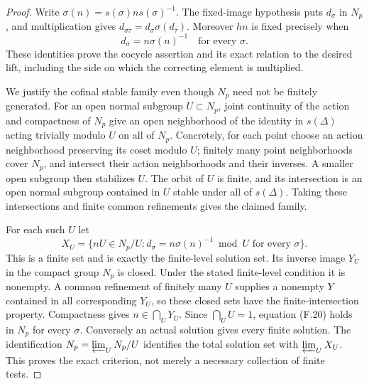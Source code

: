 \begin{proof}
Write $\sigma(n)=s(\sigma)n s(\sigma)^{-1}$.
The fixed-image hypothesis puts $d_\sigma$ in $N_p$,
and multiplication gives
$d_{\sigma\tau}=d_\sigma\sigma(d_\tau)$.
Moreover $hn$ is fixed precisely when
\[
             d_\sigma=n\sigma(n)^{-1}
                         \quad\text{for every }\sigma.       \tag{F.20}
\]
These identities prove the cocycle assertion and its
exact relation to the desired lift, including the
side on which the correcting element is multiplied.

We justify the cofinal stable family even though
$N_p$ need not be finitely generated.
For an open normal subgroup $U\subset N_p$, joint
continuity of the action and compactness of $N_p$
give an open neighborhood of the identity in
$s(\Delta)$ acting trivially modulo $U$ on all of
$N_p$.  Concretely, for each point choose an action
neighborhood preserving its coset modulo $U$;
finitely many point neighborhoods cover $N_p$,
and intersect their action neighborhoods and
their inverses.  A smaller open subgroup then
stabilizes $U$.  The orbit of $U$ is finite, and
its intersection is an open normal subgroup
contained in $U$ stable under all of $s(\Delta)$.
Taking these intersections and finite common
refinements gives the claimed family.

For each such $U$ let
\[
 X_U=\{nU\in N_p/U:
      d_\sigma=n\sigma(n)^{-1}\bmod U\text{ for every }\sigma\}.
\]
This is a finite set and is exactly the finite-level
solution set.  Its inverse image $Y_U$ in the compact
group $N_p$ is closed.  Under the stated finite-level
condition it is nonempty.  A common refinement of
finitely many $U$ supplies a nonempty $Y$ contained
in all corresponding $Y_U$, so these closed sets
have the finite-intersection property.  Compactness
gives $n\in\bigcap_UY_U$.  Since $\bigcap_UU=1$,
equation (F.20) holds in $N_p$ for every $\sigma$.
Conversely an actual solution gives every finite
solution.  The identification
$N_p=\varprojlim_U N_p/U$ identifies the total
solution set with $\varprojlim_UX_U$.
This proves the exact criterion, not merely a
necessary collection of finite tests.
\end{proof}

